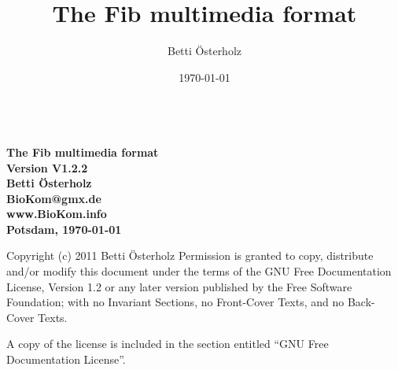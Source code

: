 \documentclass[11pt,a4paper]{article}
\begin{document}
\setlength{\unitlength}{1cm} %

\title{The Fib multimedia format}
\author{Betti \"{O}sterholz}
\date{\today}

\begin{titlepage}
	\begin{center}
	\ \vspace{2.5cm} \\
	\Huge\bf The Fib multimedia format\\\vspace{0.5cm}
	\LARGE Version V1.2.2\\\vspace{2cm}
	\LARGE Betti \"{O}sterholz\\\vspace{0.5cm}
	\large BioKom@gmx.de\\\vspace{0.5cm}
	\large www.BioKom.info\\\vspace{0.5cm}
	Potsdam, \today\\\vspace{5.5cm}
	\end{center}
	
	\noindent
Copyright (c) 2011  Betti \"{O}sterholz
\newline\newline
Permission is granted to copy, distribute and/or modify this document under the terms of the GNU Free Documentation License, Version 1.2 or any later version published by the Free Software Foundation; with no Invariant Sections, no Front-Cover Texts, and no Back-Cover Texts.

A copy of the license is included in the section entitled "`GNU Free Documentation License"'.
\end{titlepage}

\renewcommand{\sectionmark}[1]{\markboth{#1}{}}
\pagestyle{scrheadings} %
\setheadsepline{0.4pt}
\ihead{} %
\ohead{} %
\chead{\slshape \headmark}  %
\cfoot{\thepage} %


\ihead{\slshape \headmark } %
\ohead{}
\chead{}
\clearpage
\end{document}
